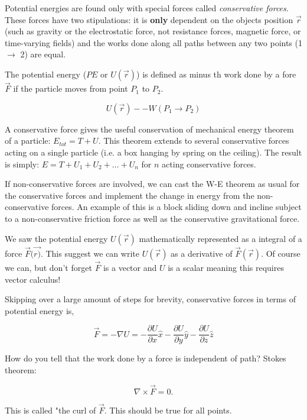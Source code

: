 Potential energies are found only with special forces called {\itshape conservative forces}. These forces have two stipulations: it is {\bfseries only} dependent on the objects position $\vec{r}$ (such as gravity or the electrostatic force, not resistance forces, magnetic force, or time-varying fields) and the works done along all paths between any two points (1 $\rightarrow$ 2) are equal.

The potential energy ($PE$ or $U(\vec{r})$) is defined as minus th work done by a fore $\vec{F}$ if the particle moves from point $P_1$ to $P_2$.

\begin{equation*}
    U(\vec{r}) - -W(P_1 \rightarrow P_2)
\end{equation*}

A conservative force gives the useful conservation of mechanical energy theorem of a particle: $E_{tot} = T + U$. This theorem extends to several conservative forces acting on a single particle (i.e. a box hanging by spring on the ceiling). The result is simply: $E = T + U_1 + U_2 + \dotsc + U_n$ for $n$ acting conservative forces.

If non-conservative forces are involved, we can cast the W-E theorem as usual for the conservative forces and implement the change in energy from the non-conservative forces. An example of this is a block sliding down and incline subject to a non-conservative friction force as well as the conservative gravitational force.

We saw the potential energy $U(\vec{r})$ mathematically represented as a integral of a force $\vec{F}(\vec{r)}$. This suggest we can write $U(\vec{r})$ as a derivative of $\vec{F}(\vec{r})$. Of course we can, but don't forget $\vec{F}$ is a vector and $U$ is a scalar meaning this requires vector calculus!

Skipping over a large amount of steps for brevity, conservative forces in terms of potential energy is,

\begin{equation*}
    \vec{F} = - \nabla U = -\frac{\partial U}{\partial x} \hat{x} -\frac{\partial U}{\partial y} \hat{y} -\frac{\partial U}{\partial z} \hat{z}
\end{equation*}

How do you tell that the work done by a force is independent of path? Stokes theorem:

\begin{equation*}
    \nabla \times \vec{F} = 0.
\end{equation*}

\noindent This is called "the curl of $\vec{F}$. This should be true for all points. 

